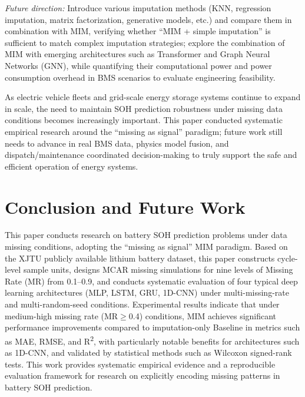 \documentclass[5p,times]{elsarticle}
\begin{document}
\textit{Future direction:} Introduce various imputation methods (KNN, regression imputation, matrix factorization, generative models, etc.) and compare them in combination with MIM, verifying whether ``MIM + simple imputation'' is sufficient to match complex imputation strategies; explore the combination of MIM with emerging architectures such as Transformer and Graph Neural Networks (GNN), while quantifying their computational power and power consumption overhead in BMS scenarios to evaluate engineering feasibility.

As electric vehicle fleets and grid-scale energy storage systems continue to expand in scale, the need to maintain SOH prediction robustness under missing data conditions becomes increasingly important. This paper conducted systematic empirical research around the ``missing as signal'' paradigm; future work still needs to advance in real BMS data, physics model fusion, and dispatch/maintenance coordinated decision-making to truly support the safe and efficient operation of energy systems.

\section{Conclusion and Future Work}\label{sec:conclusion}

This paper conducts research on battery SOH prediction problems under data missing conditions, adopting the ``missing as signal'' MIM paradigm. Based on the XJTU publicly available lithium battery dataset, this paper constructs cycle-level sample units, designs MCAR missing simulations for nine levels of Missing Rate (MR) from 0.1--0.9, and conducts systematic evaluation of four typical deep learning architectures (MLP, LSTM, GRU, 1D-CNN) under multi-missing-rate and multi-random-seed conditions. Experimental results indicate that under medium-high missing rate (MR$\geq$0.4) conditions, MIM achieves significant performance improvements compared to imputation-only Baseline in metrics such as MAE, RMSE, and R\textsuperscript{2}, with particularly notable benefits for architectures such as 1D-CNN, and validated by statistical methods such as Wilcoxon signed-rank tests. This work provides systematic empirical evidence and a reproducible evaluation framework for research on explicitly encoding missing patterns in battery SOH prediction.
\end{document}
